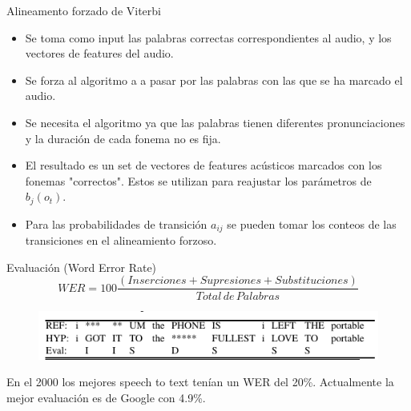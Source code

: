 \documentclass[11pt,xcolor={dvipsnames}]{beamer}
\begin{document}
\begin{frame}{Alineamento forzado de Viterbi}
\begin{itemize}
\item Se toma como input las palabras correctas correspondientes al audio, y los vectores de features del audio.
\item Se forza al algoritmo a a pasar por las palabras con las que se ha marcado el audio. 
\item Se necesita el algoritmo ya que las palabras tienen diferentes pronunciaciones y la duración de cada fonema no es fija. 
\item El resultado es un set de vectores de features acústicos marcados con los fonemas "correctos". Estos se utilizan para reajustar los parámetros de $b_j(o_t).$
\item Para las probabilidades de transición $a_{ij}$ se pueden tomar los conteos de las transiciones en el alineamiento forzoso.
\end{itemize}
\end{frame}

\begin{frame}{Evaluación (Word Error Rate)}
$$ WER = 100\frac{(Inserciones + Supresiones + Substituciones)}{Total\, de \, Palabras}$$
\begin{figure}
\includegraphics[width=1\linewidth]{errores.png}
\end{figure}
En el 2000 los mejores speech to text tenían un WER del 20\%. Actualmente la mejor evaluación es de Google con 4.9\%.
\end{frame}


{ %
    \begin{frame}[plain]
     \end{frame}
}
\end{document}
